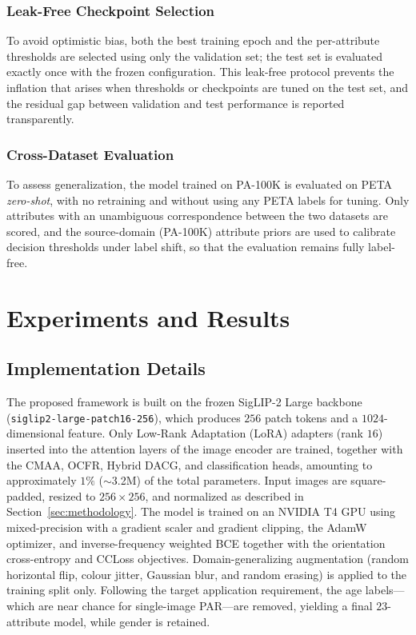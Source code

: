 \documentclass{ieeeaccess}
\begin{document}
\subsubsection{Leak-Free Checkpoint Selection}
To avoid optimistic bias, both the best training epoch and the per-attribute thresholds are selected
using only the validation set; the test set is evaluated exactly once with the frozen configuration.
This leak-free protocol prevents the inflation that arises when thresholds or checkpoints are tuned on
the test set, and the residual gap between validation and test performance is reported transparently.

\subsubsection{Cross-Dataset Evaluation}
To assess generalization, the model trained on PA-100K is evaluated on PETA \textit{zero-shot}, with
no retraining and without using any PETA labels for tuning. Only attributes with an unambiguous
correspondence between the two datasets are scored, and the source-domain (PA-100K) attribute priors
are used to calibrate decision thresholds under label shift, so that the evaluation remains fully
label-free.

\section{Experiments and Results}
\label{sec:results}

\subsection{Implementation Details}
The proposed framework is built on the frozen SigLIP-2 Large backbone
(\texttt{siglip2-large-patch16-256}), which produces $256$ patch tokens and a $1024$-dimensional
feature. Only Low-Rank Adaptation (LoRA) adapters (rank $16$) inserted into the attention layers of
the image encoder are trained, together with the CMAA, OCFR, Hybrid DACG, and classification heads,
amounting to approximately $1\%$ ($\sim$3.2M) of the total parameters. Input images are square-padded,
resized to $256\times256$, and normalized as described in Section~\ref{sec:methodology}. The model is
trained on an NVIDIA T4 GPU using mixed-precision with a gradient scaler and gradient clipping, the
AdamW optimizer, and inverse-frequency weighted BCE together with the orientation cross-entropy and
CCLoss objectives. Domain-generalizing augmentation (random horizontal flip, colour jitter, Gaussian
blur, and random erasing) is applied to the training split only. Following the target application
requirement, the age labels---which are near chance for single-image PAR---are removed, yielding a
final $23$-attribute model, while gender is retained.
\end{document}
